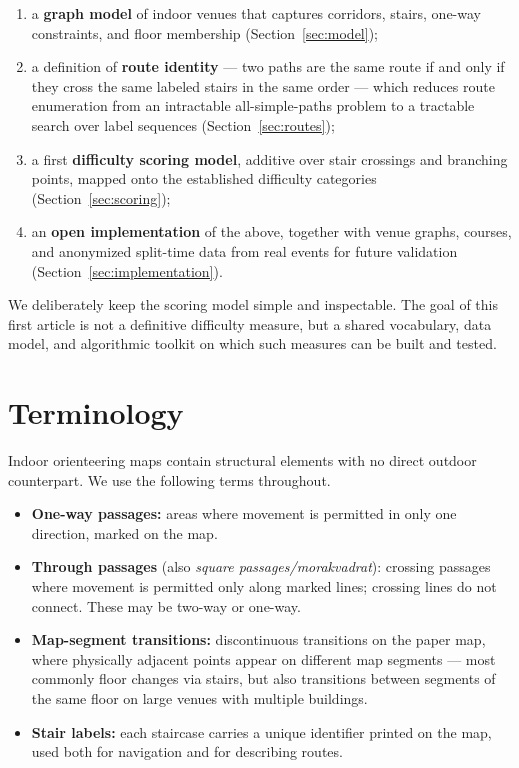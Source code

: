 \documentclass[11pt,a4paper,twocolumn]{article}
\begin{document}
\begin{enumerate}
    \item a \textbf{graph model} of indoor venues that captures corridors,
          stairs, one-way constraints, and floor membership
          (Section~\ref{sec:model});
    \item a definition of \textbf{route identity} --- two paths are the same
          route if and only if they cross the same labeled stairs in the same
          order --- which reduces route enumeration from an intractable
          all-simple-paths problem to a tractable search over label sequences
          (Section~\ref{sec:routes});
    \item a first \textbf{difficulty scoring model},
          additive over stair crossings and branching points, mapped onto the
          established difficulty categories (Section~\ref{sec:scoring});
    \item an \textbf{open implementation} of the above, together with
          venue graphs, courses, and anonymized split-time data from real events for future validation
          (Section~\ref{sec:implementation}).
\end{enumerate}

We deliberately keep the scoring model simple and inspectable. The goal of
this first article is not a definitive difficulty measure, but a shared
vocabulary, data model, and algorithmic toolkit on which such measures can be
built and tested.

\section{Terminology}
\label{sec:terminology}

Indoor orienteering maps contain structural elements with no direct outdoor
counterpart. We use the following terms throughout.

\begin{itemize}
    \item \textbf{One-way passages:} areas where movement is permitted in
          only one direction, marked on the map.
    \item \textbf{Through passages} (also \emph{square passages/morakvadrat}): crossing
          passages where movement is permitted only along marked lines;
          crossing lines do not connect. These may be two-way or one-way.
    \item \textbf{Map-segment transitions:} discontinuous transitions on the
          paper map, where physically adjacent points appear on different map
          segments --- most commonly floor changes via stairs, but also
          transitions between segments of the same floor on large venues with multiple buildings.
    \item \textbf{Stair labels:} each staircase carries a unique identifier
          printed on the map, used both for navigation and for describing
          routes.
\end{itemize}
\end{document}
